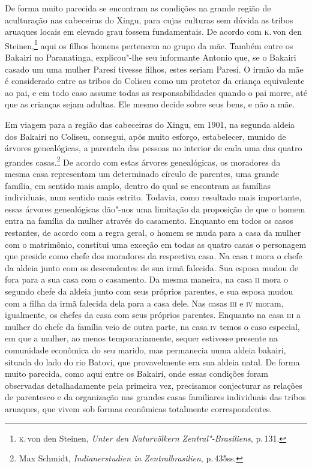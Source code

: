De forma muito parecida se encontram as condições na grande região de
aculturação nas cabeceiras do Xingu, para cujas culturas sem dúvida as
tribos aruaques locais em elevado grau fossem fundamentais. De acordo com
\textsc{k}.\,von den Steinen,\footnote{\textsc{k}.\,von den Steinen, \textit{Unter den
  Naturvölkern Zentral"-Brasiliens}, p.\,131.} aqui os filhos homens
pertencem ao grupo da mãe. Também entre os Bakairi no Paranatinga,
explicou"-lhe seu informante Antonio que, se o Bakairi casado um uma
mulher Paresí tivesse filhos, estes seriam Paresí. O irmão da mãe é
considerado entre as tribos do Coliseu como um protetor da criança
equivalente ao pai, e em todo caso assume todas as responsabilidades
quando o pai morre, até que as crianças sejam adultas. Ele mesmo decide sobre
seus bens, e não a mãe.

Em viagem para a região das cabeceiras do Xingu, em 1901, na
segunda aldeia dos Bakairi no Coliseu, consegui, após muito esforço,
estabelecer, munido de árvores genealógicas, a parentela das pessoas no
interior de cada uma das quatro grandes casas.\footnote{Max Schmidt,
  \textit{Indianerstudien in Zentralbrasilien}, p.\,435ss.} De acordo com
estas árvores genealógicas, os moradores da mesma casa representam um
determinado círculo de parentes, uma grande família, em sentido mais
amplo, dentro do qual se encontram as famílias individuais, num sentido
mais estrito. Todavia, como resultado mais importante, essas árvores
genealógicas dão"-nos uma limitação da proposição de que o homem entra
na família da mulher através do casamento. Enquanto em todos os casos
restantes, de acordo com a regra geral, o homem se muda para a casa da
mulher com o matrimônio, constitui uma exceção em todas as quatro casas
o personagem que preside como chefe dos moradores da respectiva casa. Na
casa \textsc{i} mora o chefe da aldeia junto com os descendentes de sua irmã
falecida. Sua esposa mudou de fora para a sua casa com o casamento. Da
mesma maneira, na casa \textsc{ii} mora o segundo chefe da aldeia junto com seus
próprios parentes, e sua esposa mudou com a filha da irmã falecida dela
para a casa dele. Nas casas \textsc{iii} e \textsc{iv} moram, igualmente, os chefes da
casa com seus próprios parentes. Enquanto na casa \textsc{iii} a mulher do chefe
da família veio de outra parte, na casa \textsc{iv} temos o caso especial, em que
a mulher, ao menos temporariamente, sequer estivesse presente na
comunidade econômica do seu marido, mas permanecia numa aldeia bakairi,
situada do lado do rio Batovi, que provavelmente era sua aldeia natal.
De forma muito parecida, como aqui entre os Bakairi, onde essas
condições foram observadas detalhadamente pela primeira vez, precisamos
conjecturar as relações de parentesco e da organização nas grandes casas
familiares individuais das tribos aruaques, que vivem sob formas
econômicas totalmente correspondentes. 

